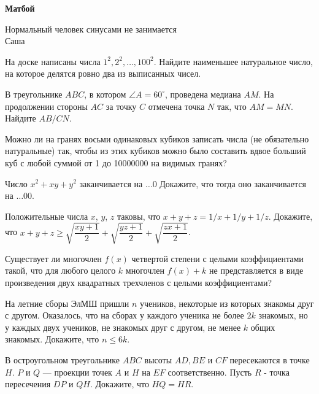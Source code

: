 \centerline{\bf \Huge Матбой}

\begin{flushright}
        \scriptsize{Нормальный человек синусами не занимается\\ Саша}
\end{flushright}

На доске написаны числа $1^2, 2^2, \ldots, 100^2$. Найдите наименьшее натуральное число, на которое делятся ровно два из выписанных чисел.

В треугольнике $A B C$, в котором $\angle A=60^{\circ}$, проведена медиана $A M$. На продолжении стороны $A C$ за точку $C$ отмечена точка $N$ так, что $A M=M N$. Найдите $A B / C N$.


Можно ли на гранях восьми одинаковых кубиков записать числа (не обязательно натуральные) так, чтобы из этих кубиков можно было составить вдвое больший куб с любой суммой от 1 до 10000000 на видимых гранях?

Число $x^2+xy+y^2$ заканчивается на $\ldots0$ Докажите, что тогда оно заканчивается на $\ldots00.$

Положительные числа $x$, $y$, $z$ таковы, что $x+y+z=1/x+1/y+1/z$. Докажите, что $x+y+z\geq\sqrt{\dfrac{xy+1}{2}}+\sqrt{\dfrac{yz+1}{2}}+\sqrt{\dfrac{zx+1}{2}}$.


Существует ли многочлен $f(x)$ четвертой степени с целыми коэффициентами такой, что для любого целого $k$ многочлен $f(x)+k$ не представляется в виде произведения двух квадратных трехчленов с целыми коэффициентами?


На летние сборы ЭлМШ пришли $n$ учеников, некоторые из которых знакомы друг с другом. Оказалось, что на сборах у каждого ученика не более $2k$ знакомых, но у каждых двух учеников, не знакомых друг с другом, не менее $k$ общих знакомых. Докажите, что $n \leq 6k$.


В остроугольном треугольнике $A B C$ высоты $A D, B E$ и $C F$ пересекаются в точке $H.$ $P$ и $Q$ --- проекции точек $A$ и $H$ на $E F$ соответственно. Пусть $R$ - точка пересечения $D P$ и $Q H$. Докажите, что $HQ = HR$.